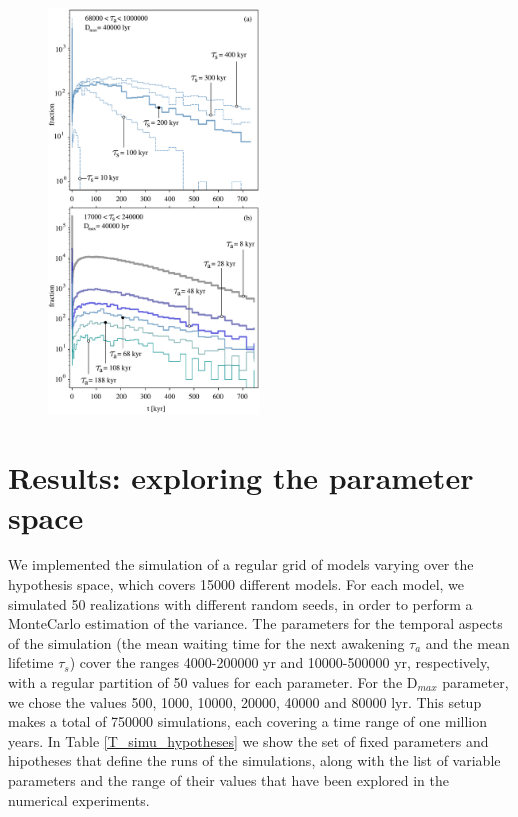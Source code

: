 \begin{figure}
   \centering
   \includegraphics[width=0.5\textwidth]{waiting_s+a_dif_ylog.pdf}
   \label{F_waiting_for_1C}
\end{figure}


  

 

\section{Results: exploring the parameter space}\label{S_results}

We implemented the simulation of a regular grid of models varying over
the hypothesis space, which covers 15000 different models.
%
For each model, we simulated 50 realizations with different random
seeds, in order to perform a MonteCarlo estimation of the variance.
%
The parameters for the temporal aspects of the simulation (the mean
waiting time for the next awakening $\tau_a$ and the mean lifetime
$\tau_s$) cover the ranges 4000-200000 yr and 10000-500000 yr,
respectively, with a regular partition of 50 values for each
parameter.
%
For the D$_{max}$ parameter, we chose the values 500, 1000, 10000,
20000, 40000 and 80000 lyr.
%
This setup makes a total of 750000 simulations, each covering a time
range of one million years.
%
In Table \ref{T_simu_hypotheses} we show the set of fixed parameters
and hipotheses that define the runs of the simulations, along with the
list of variable parameters and the range of their values that have
been explored in the numerical experiments.


